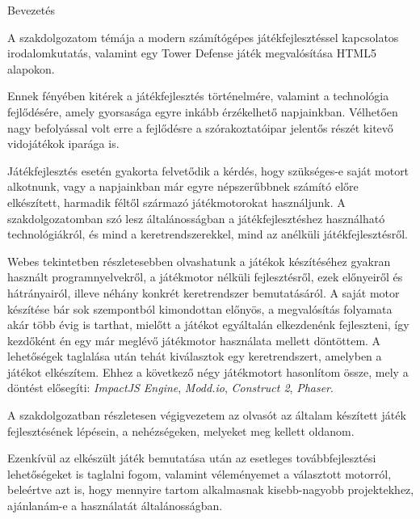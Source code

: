 \begin{MyChapter}{Bevezetés}
	
	A szakdolgozatom témája a modern számítógépes játékfejlesztéssel kapcsolatos irodalomkutatás, valamint egy Tower Defense játék megvalósítása HTML5 alapokon.
	
	Ennek fényében kitérek a játékfejlesztés történelmére, valamint a technológia fejlődésére, amely gyorsasága egyre inkább érzékelhető napjainkban. Vélhetően nagy befolyással volt erre a fejlődésre a szórakoztatóipar jelentős részét kitevő vidojátékok iparága is. 
	
	Játékfejlesztés esetén gyakorta felvetődik a kérdés, hogy szükséges-e saját motort alkotnunk, vagy a napjainkban már egyre népszerűbbnek számító előre elkészített, harmadik féltől származó játékmotorokat használjunk. A szakdolgozatomban szó lesz általánosságban a játékfejlesztéshez használható technológiákról, és mind a keretrendszerekkel, mind az anélküli játékfejlesztésről.
	
	Webes tekintetben részletesebben olvashatunk a játékok készítéséhez gyakran használt programnyelvekről, a játékmotor nélküli fejlesztésről, ezek előnyeiről és hátrányairól, illeve néhány konkrét keretrendszer bemutatásáról. A saját motor készítése bár sok szempontból kimondottan előnyös, a megvalósítás folyamata akár több évig is tarthat, mielőtt a játékot egyáltalán elkezdenénk fejleszteni, így kezdőként én egy már meglévő játékmotor használata mellett döntöttem. A lehetőségek taglalása után tehát kiválasztok egy keretrendszert, amelyben a játékot elkészítem. Ehhez a következő négy játékmotort hasonlítom össze, mely a döntést elősegíti: \textit{ImpactJS Engine}, \textit{Modd.io}, \textit{Construct 2}, \textit{Phaser}.
	
	A szakdolgozatban részletesen végigvezetem az olvasót az általam készített játék fejlesztésének lépésein, a nehézségeken, melyeket meg kellett oldanom.

	Ezenkívül az elkészült játék bemutatása után az esetleges továbbfejlesztési lehetőségeket is taglalni fogom, valamint véleményemet a választott motorról, beleértve azt is, hogy mennyire tartom alkalmasnak kisebb-nagyobb projektekhez, ajánlanám-e a használatát általánosságban.
	
\end{MyChapter}